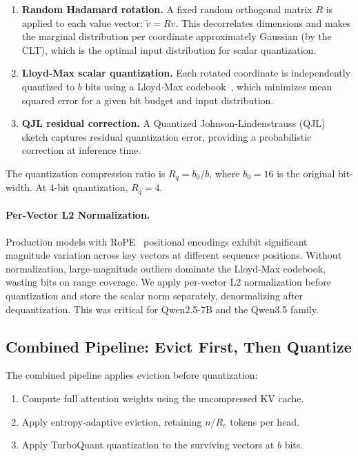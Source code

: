 \documentclass[11pt]{article}
\begin{document}
\begin{enumerate}[leftmargin=*]
    \item \textbf{Random Hadamard rotation.}  A fixed random orthogonal matrix $R$ is applied to each value vector: $\tilde{v} = Rv$.  This decorrelates dimensions and makes the marginal distribution per coordinate approximately Gaussian (by the CLT), which is the optimal input distribution for scalar quantization.
    \item \textbf{Lloyd-Max scalar quantization.}  Each rotated coordinate is independently quantized to $b$ bits using a Lloyd-Max codebook~\citep{lloyd1982least,max1960quantizing}, which minimizes mean squared error for a given bit budget and input distribution.
    \item \textbf{QJL residual correction.}  A Quantized Johnson-Lindenstrauss (QJL) sketch captures residual quantization error, providing a probabilistic correction at inference time.
\end{enumerate}

The quantization compression ratio is $R_q = b_0 / b$, where $b_0 = 16$ is the original bit-width.  At 4-bit quantization, $R_q = 4$.

\paragraph{Per-Vector L2 Normalization.}
Production models with RoPE~\citep{su2024roformer} positional encodings exhibit significant magnitude variation across key vectors at different sequence positions.  Without normalization, large-magnitude outliers dominate the Lloyd-Max codebook, wasting bits on range coverage.  We apply per-vector L2 normalization before quantization and store the scalar norm separately, denormalizing after dequantization.  This was critical for Qwen2.5-7B and the Qwen3.5 family.

\subsection{Combined Pipeline: Evict First, Then Quantize}
\label{sec:combined}

The combined pipeline applies eviction before quantization:
\begin{enumerate}[leftmargin=*]
    \item Compute full attention weights using the uncompressed KV cache.
    \item Apply entropy-adaptive eviction, retaining $n/R_e$ tokens per head.
    \item Apply TurboQuant quantization to the surviving vectors at $b$ bits.
\end{enumerate}
\end{document}
